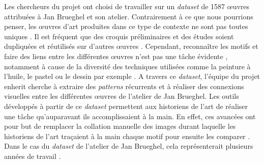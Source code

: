 Les chercheurs du projet ont choisi de travailler sur un \textit{dataset}  de 1587 œuvres attribuées à Jan Brueghel et son atelier. Contrairement à ce que nous pourrions penser, les œuvres d'art produites dans ce type de contexte ne sont pas toutes uniques . Il est fréquent que des croquis préliminaires et des études soient dupliquées et réutilisés sur d'autres œuvres . Cependant, reconnaître les motifs et faire des liens entre les différentes œuvres n'est pas une tâche évidente , notamment à cause de la diversité des techniques utilisées comme la peinture à l'huile, le pastel ou le dessin par exemple . A travers ce \textit{dataset}, l'équipe du projet \gls{enherit} cherche à extraire des \textit{patterns} récurrents et à réaliser des connexions visuelles entre les différentes œuvres de l'atelier de Jan Brueghel. Les outils développés à partir de ce \textit{dataset} permettent aux historiens de l'art de réaliser une tâche qu'auparavant ils accomplissaient à la main. En effet, ces avancées ont pour but de remplacer la collation manuelle des images durant laquelle les historiens de l'art traçaient à la main chaque motif pour ensuite les comparer . Dans le cas du \textit{dataset} de l'atelier de Jan Brueghel, cela représenterait plusieurs années de travail .

